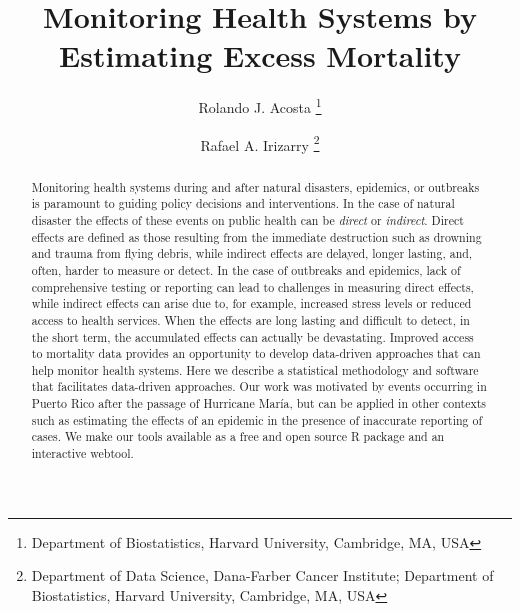\documentclass[11pt]{article}
\begin{document}
\title{Monitoring Health Systems by Estimating Excess Mortality}
 
\author{
{Rolando J. Acosta \footnote{Department of Biostatistics, Harvard University, Cambridge, MA, USA}} \and {Rafael A. Irizarry \footnote{Department of Data Science, Dana-Farber Cancer Institute; \newline Department of Biostatistics, Harvard University, Cambridge, MA, USA}}
}

\maketitle
\setcounter{page}{0}

\begin{abstract}
Monitoring health systems during and after natural disasters, epidemics, or outbreaks is paramount to guiding policy decisions and interventions. In the case of natural disaster the effects of these events on public health can be \textit{direct} or \textit{indirect}. Direct effects are defined as those resulting from the immediate destruction such as drowning and trauma from flying debris, while indirect effects are delayed, longer lasting, and, often, harder to measure or detect. In the case of outbreaks and epidemics, lack of comprehensive testing or reporting can lead to challenges in measuring direct effects, while indirect effects can arise due to, for example, increased stress levels or reduced access to health services. When the effects are long lasting and difficult to detect, in the short term, the accumulated effects can actually be devastating. Improved access to mortality data provides an opportunity to develop data-driven approaches that can help monitor health systems.
Here we describe a statistical methodology and software that facilitates data-driven approaches. Our work was motivated by events occurring in Puerto Rico after the passage of Hurricane Mar\'ia, but can be applied in other contexts such as estimating the effects of an epidemic in the presence of inaccurate reporting of cases. We make our tools available as a free and open source R package and an interactive webtool.
\end{abstract}

\newpage
\end{document}
